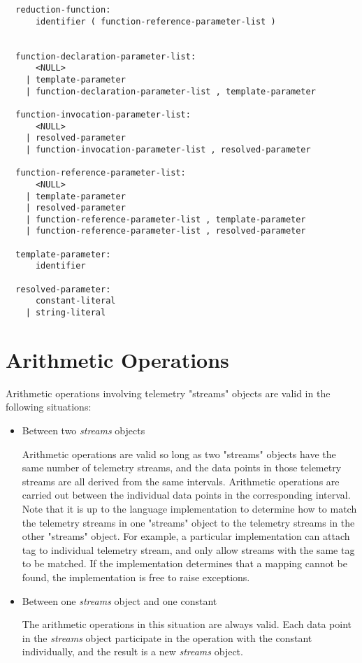\begin{verbatim}
  reduction-function:
      identifier ( function-reference-parameter-list )
    
   
  function-declaration-parameter-list:
      <NULL>
    | template-parameter
    | function-declaration-parameter-list , template-parameter
    
  function-invocation-parameter-list:
      <NULL>
    | resolved-parameter
    | function-invocation-parameter-list , resolved-parameter
   
  function-reference-parameter-list:
      <NULL>
    | template-parameter
    | resolved-parameter
    | function-reference-parameter-list , template-parameter
    | function-reference-parameter-list , resolved-parameter
   
  template-parameter:
      identifier
      
  resolved-parameter:
      constant-literal
    | string-literal    
\end{verbatim}


 
 
\section{Arithmetic Operations}

Arithmetic operations involving telemetry "streams" objects are valid in the following situations:

\begin{itemize}
	\item Between two \textit{streams} objects

Arithmetic operations are valid so long as two "streams" objects have the same number of telemetry streams, and the data points in those telemetry streams are all derived from the same intervals. Arithmetic operations are carried out between the individual data points in the corresponding interval. Note that it is up to the language implementation to determine how to match the telemetry streams in one "streams" object to the telemetry streams in the other "streams" object. For example, a particular implementation can attach tag to individual telemetry stream, and only allow streams with the same tag to be matched. If the implementation determines that a mapping cannot be found, the implementation is free to raise exceptions.

  \item Between one \textit{streams} object and one constant

The arithmetic operations in this situation are always valid. Each data point in the \textit{streams} object participate in the operation with the constant individually, and the result is a new \textit{streams} object.

\end{itemize}
 
